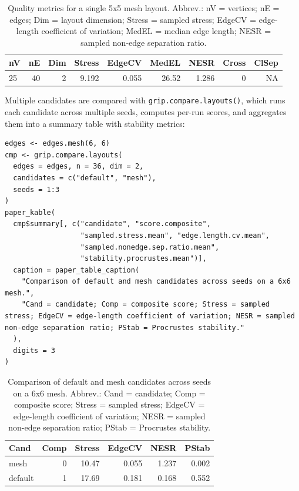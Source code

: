 \begin{table}

\caption{\label{tab:unnamed-chunk-3}Quality metrics for a single 5x5 mesh layout. Abbrev.: nV = vertices; nE = edges; Dim = layout dimension; Stress = sampled stress; EdgeCV = edge-length coefficient of variation; MedEL = median edge length; NESR = sampled non-edge separation ratio.}
\centering
\begin{tabular}[t]{l|r|r|r|r|r|r|r|r}
\hline
nV & nE & Dim & Stress & EdgeCV & MedEL & NESR & Cross & ClSep\\
\hline
25 & 40 & 2 & 9.192 & 0.055 & 26.52 & 1.286 & 0 & NA\\
\hline
\end{tabular}
\end{table}

Multiple candidates are compared with \texttt{grip.compare.layouts()}, which runs
each candidate across multiple seeds, computes per-run scores, and aggregates
them into a summary table with stability metrics:

\begin{verbatim}
edges <- edges.mesh(6, 6)
cmp <- grip.compare.layouts(
  edges = edges, n = 36, dim = 2,
  candidates = c("default", "mesh"),
  seeds = 1:3
)
paper_kable(
  cmp$summary[, c("candidate", "score.composite",
                  "sampled.stress.mean", "edge.length.cv.mean",
                  "sampled.nonedge.sep.ratio.mean",
                  "stability.procrustes.mean")],
  caption = paper_table_caption(
    "Comparison of default and mesh candidates across seeds on a 6x6 mesh.",
    "Cand = candidate; Comp = composite score; Stress = sampled stress; EdgeCV = edge-length coefficient of variation; NESR = sampled non-edge separation ratio; PStab = Procrustes stability."
  ),
  digits = 3
)
\end{verbatim}

\begin{table}

\caption{\label{tab:unnamed-chunk-4}Comparison of default and mesh candidates across seeds on a 6x6 mesh. Abbrev.: Cand = candidate; Comp = composite score; Stress = sampled stress; EdgeCV = edge-length coefficient of variation; NESR = sampled non-edge separation ratio; PStab = Procrustes stability.}
\centering
\begin{tabular}[t]{l|r|r|r|r|r}
\hline
Cand & Comp & Stress & EdgeCV & NESR & PStab\\
\hline
mesh & 0 & 10.47 & 0.055 & 1.237 & 0.002\\
\hline
default & 1 & 17.69 & 0.181 & 0.168 & 0.552\\
\hline
\end{tabular}
\end{table}

